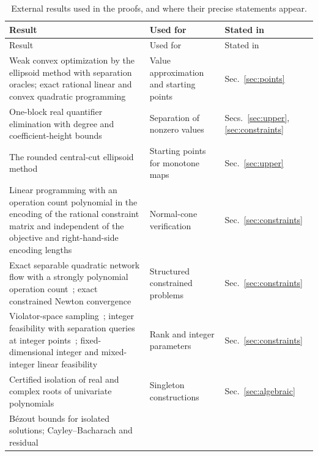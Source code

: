 {\small
\setlength{\tabcolsep}{4pt}
\setlength{\LTcapwidth}{\textwidth}
\begin{longtable}{@{}>{\raggedright\arraybackslash}p{}
  >{\raggedright\arraybackslash}p{}
  >{\raggedright\arraybackslash}p{}@{}}
\caption{External results used in the proofs, and where their precise
statements appear.}
\label{tab:models-imported}\\
\toprule
Result & Used for & Stated in\\
\midrule
\endfirsthead
\toprule
Result & Used for & Stated in\\
\midrule
\endhead
\bottomrule
\endfoot
Weak convex optimization by the ellipsoid method with separation oracles;
exact rational linear and convex quadratic
programming~\cite{GroetschelLovaszSchrijver1988,KozlovTarasovKhachiyan1980}
& Value approximation and starting points & Sec.~\ref{sec:points}\\
One-block real quantifier elimination with degree and coefficient-height
bounds~\cite[Theorem~2.27]{Basu2014} & Separation of nonzero values &
Secs.~\ref{sec:upper}, \ref{sec:constraints}\\
The rounded central-cut ellipsoid method~\cite{GroetschelLovaszSchrijver1988}
& Starting points for monotone maps & Sec.~\ref{sec:upper}\\
Linear programming with an operation count polynomial in the encoding of
the rational constraint matrix and independent of the objective and
right-hand-side encoding lengths~\cite{GroetschelLovaszSchrijver1988} & Normal-cone
verification & Sec.~\ref{sec:constraints}\\
Exact separable quadratic network flow with a strongly polynomial operation
count~\cite{Vegh2016}; exact constrained Newton
convergence~\cite{LeeSunSaunders2014} & Structured constrained problems &
Sec.~\ref{sec:constraints}\\
Violator-space sampling~\cite{GaertnerMatousekRuestSkovron2008}; integer
feasibility with separation queries at integer
points~\cite{AriHildebrand2026,HildebrandGoess2024,Basu2023Integers};
fixed-dimensional integer and mixed-integer linear
feasibility~\cite{HildebrandKoeppe2013,DelPia2023} & Rank and integer
parameters & Sec.~\ref{sec:constraints}\\
Certified isolation of real and complex roots of univariate
polynomials~\cite[Theorem~5]{MehlhornSagraloffWang2015} & Singleton
constructions & Sec.~\ref{sec:algebraic}\\
Bézout bounds for isolated solutions; Cayley--Bacharach and residual

\end{longtable}}
